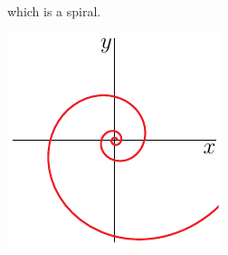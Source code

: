 \begin{eg}
\begin{equation*}
\end{equation*}
which is a spiral.
\begin{efig}
\begin{center}
    \includegraphics{beadCurve.pdf}
\end{center}
\end{efig}
\end{eg}

